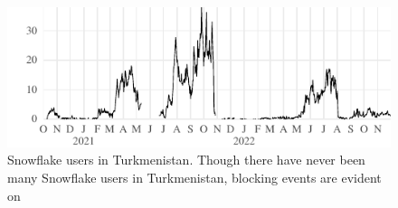\documentclass[letterpaper,twocolumn]{article}
\begin{document}
\begin{figure}
\begin{minipage}[t][\textheight][b]{\linewidth}
{}
\vfill
\includegraphics{figures/users/users-tm}
\caption{
Snowflake users in Turkmenistan.
Though there have never been many Snowflake users in Turkmenistan,
blocking events are evident on
}
\end{minipage}
\end{figure}
\end{document}
